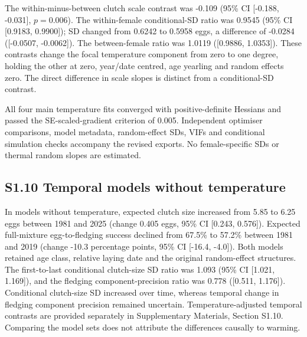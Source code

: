 \documentclass{article}
\begin{document}
The within-minus-between clutch scale contrast was -0.109 (95\% CI [-0.188, -0.031], $p=0.006$). The within-female conditional-SD ratio was 0.9545 (95\% CI [0.9183, 0.9900]); SD changed from 0.6242 to 0.5958 eggs, a difference of -0.0284 ([-0.0507, -0.0062]). The between-female ratio was 1.0119 ([0.9886, 1.0353]). These contrasts change the focal temperature component from zero to one degree, holding the other at zero, year/date centred, age yearling and random effects zero. The direct difference in scale slopes is distinct from a conditional-SD contrast.

All four main temperature fits converged with positive-definite Hessians and passed the SE-scaled-gradient criterion of 0.005. Independent optimiser comparisons, model metadata, random-effect SDs, VIFs and conditional simulation checks accompany the revised exports. No female-specific SDs or thermal random slopes are estimated.

\subsection{S1.10 Temporal models without temperature}
\label{sec:temporal-without-temperature}

In models without temperature, expected clutch size increased from 5.85 to 6.25 eggs between 1981 and 2025 (change 0.405 eggs, 95\% CI [0.243, 0.576]). Expected full-mixture egg-to-fledging success declined from 67.5\% to 57.2\% between 1981 and 2019 (change -10.3 percentage points, 95\% CI [-16.4, -4.0]). Both models retained age class, relative laying date and the original random-effect structures. The first-to-last conditional clutch-size SD ratio was 1.093 (95\% CI [1.021, 1.169]), and the fledging component-precision ratio was 0.778 ([0.511, 1.176]). Conditional clutch-size SD increased over time, whereas temporal change in fledging component precision remained uncertain. Temperature-adjusted temporal contrasts are provided separately in Supplementary Materials, Section S1.10. Comparing the model sets does not attribute the differences causally to warming.
\end{document}

